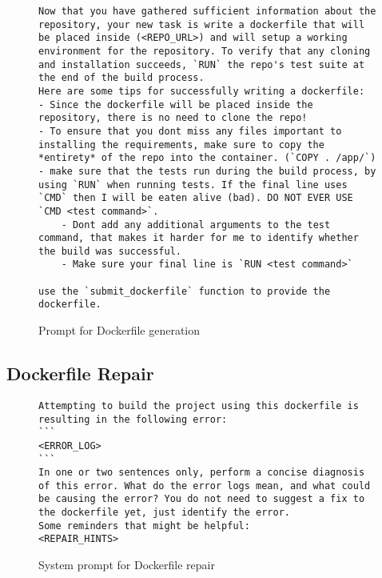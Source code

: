 \documentclass[conference]{IEEEtran}
\begin{document}
\begin{figure}[h!]
        \begin{lstlisting}
Now that you have gathered sufficient information about the repository, your new task is write a dockerfile that will be placed inside (<REPO_URL>) and will setup a working environment for the repository. To verify that any cloning and installation succeeds, `RUN` the repo's test suite at the end of the build process.
Here are some tips for successfully writing a dockerfile:
- Since the dockerfile will be placed inside the repository, there is no need to clone the repo!
- To ensure that you dont miss any files important to installing the requirements, make sure to copy the *entirety* of the repo into the container. (`COPY . /app/`)
- make sure that the tests run during the build process, by using `RUN` when running tests. If the final line uses `CMD` then I will be eaten alive (bad). DO NOT EVER USE `CMD <test command>`.
    - Dont add any additional arguments to the test command, that makes it harder for me to identify whether the build was successful.
    - Make sure your final line is `RUN <test command>`

use the `submit_dockerfile` function to provide the dockerfile.
        \end{lstlisting}
        \caption{Prompt for Dockerfile generation}
        \label{fig:dockerfile-gen}
    \end{figure}
\newpage

\subsection{Dockerfile Repair}
\begin{figure}[h!]
    \begin{lstlisting}
Attempting to build the project using this dockerfile is resulting in the following error:
```
<ERROR_LOG>
```
In one or two sentences only, perform a concise diagnosis of this error. What do the error logs mean, and what could be causing the error? You do not need to suggest a fix to the dockerfile yet, just identify the error.
Some reminders that might be helpful:
<REPAIR_HINTS>
    \end{lstlisting}
    \caption{System prompt for Dockerfile repair}
\end{figure}
\end{document}
